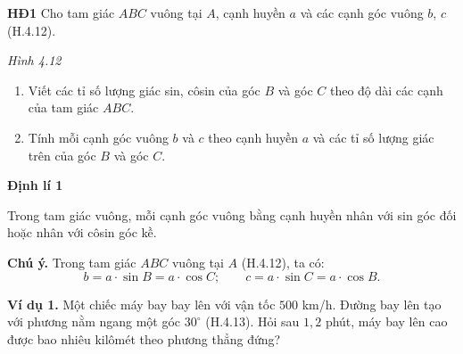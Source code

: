 \begin{lesson}
    \textbf{HĐ1} Cho tam giác $ABC$ vuông tại $A$, cạnh huyền $a$ và các cạnh góc vuông $b$, $c$ (H.4.12).

    \begin{center}

        \textit{Hình 4.12}
    \end{center}

    \begin{enumerate}[label=\alph*)]
        \item Viết các tỉ số lượng giác sin, côsin của góc $B$ và góc $C$ theo độ dài các cạnh của tam giác $ABC$.

        \answerline
        \answerline
        \item Tính mỗi cạnh góc vuông $b$ và $c$ theo cạnh huyền $a$ và các tỉ số lượng giác trên của góc $B$ và góc $C$.

        \answerline
        \answerline
    \end{enumerate}

    \textbf{Định lí 1}
    \begin{keyconcept}
        Trong tam giác vuông, mỗi cạnh góc vuông bằng cạnh huyền nhân với sin góc đối hoặc nhân với côsin góc kề.
    \end{keyconcept}

    \textbf{Chú ý.} Trong tam giác $ABC$ vuông tại $A$ (H.4.12), ta có:
    \[
        b=a\cdot\sin B=a\cdot\cos C;\qquad c=a\cdot\sin C=a\cdot\cos B.
    \]

    \textbf{Ví dụ 1.} Một chiếc máy bay bay lên với vận tốc $500$ km/h. Đường bay lên tạo với phương nằm ngang một góc $30^\circ$ (H.4.13). Hỏi sau $1{,}2$ phút, máy bay lên cao được bao nhiêu kilômét theo phương thẳng đứng?



\end{lesson}
